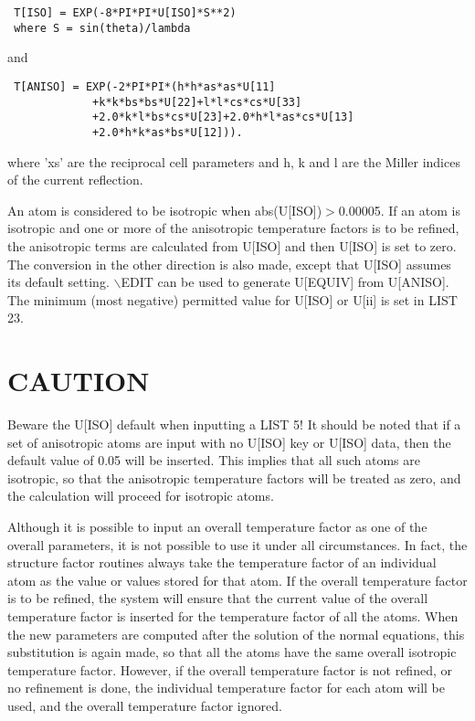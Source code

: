 \documentclass[10pt,a4paper]{report}
\begin{document}
\small\begin{verbatim}
 T[ISO] = EXP(-8*PI*PI*U[ISO]*S**2) 
 where S = sin(theta)/lambda
\end{verbatim}\normalsize




and

\small\begin{verbatim}
 T[ANISO] = EXP(-2*PI*PI*(h*h*as*as*U[11]
             +k*k*bs*bs*U[22]+l*l*cs*cs*U[33]
             +2.0*k*l*bs*cs*U[23]+2.0*h*l*as*cs*U[13]
             +2.0*h*k*as*bs*U[12])).
\end{verbatim}\normalsize




where 'xs' are the reciprocal cell parameters
 and h, k and l are the Miller indices of the current reflection.


An atom is considered to be isotropic when  abs(U[ISO])$>$0.00005.
 If an atom is isotropic and one or more of the anisotropic temperature
 factors is to be refined, the anisotropic terms are calculated from
 U[ISO]  and then  U[ISO]  is set to zero. The conversion in the
 other direction is also made, except that  U[ISO]  assumes its default
 setting. $\backslash$EDIT can be used to generate U[EQUIV] from U[ANISO]. The
 minimum (most negative) permitted value for U[ISO] or U[ii] is set in
 LIST 23.
\section{CAUTION}


Beware the U[ISO] default when inputting a LIST 5!
 It should be noted that if a set of anisotropic atoms are input with no
 U[ISO]  key or  U[ISO]  data, then the default value of 0.05 will be
 inserted. This implies that all such atoms are
 isotropic, so that the anisotropic temperature factors will be treated as
 zero, and the calculation will proceed for isotropic atoms.


Although it is possible to input an overall temperature factor as one
 of the overall parameters, it is not possible to use it under all
 circumstances. In fact, the structure factor routines always take the
 temperature factor of an individual atom as the value or values stored
 for that atom. If the overall temperature factor is to be refined, the
 system will ensure that the current value of the overall temperature
 factor is inserted for the temperature factor of all the atoms. When the
 new parameters are computed after the solution of the normal equations,
 this substitution is again made, so that all the atoms have the same
 overall isotropic temperature factor. However, if the overall temperature
 factor is not refined, or no refinement is done, the individual temperature
 factor for each atom will be used, and the overall temperature factor ignored.
\end{document}

